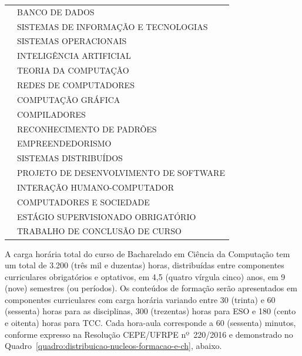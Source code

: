 \documentclass[
	12pt,				%
	openright,			%
  oneside,     %
	a4paper,			%
	chapter=TITLE,		%
	english,			%
	french,				%
	spanish,			%
	brazil				%
	]{abntex2}
\begin{document}
\begin{center}
\begin{scriptsize}
\begin{longtable}{@{}lp{10cm}}
                                & BANCO DE DADOS \\
                                & SISTEMAS DE INFORMAÇÃO E TECNOLOGIAS \\
                                & SISTEMAS OPERACIONAIS \\
                                & INTELIGÊNCIA ARTIFICIAL \\
                                & TEORIA DA COMPUTAÇÃO \\
                                & REDES DE COMPUTADORES \\
                                & COMPUTAÇÃO GRÁFICA \\
                                & COMPILADORES \\
                                & RECONHECIMENTO DE PADRÕES \\
                                & EMPREENDEDORISMO \\
                                & SISTEMAS DISTRIBUÍDOS \\
                                & PROJETO DE DESENVOLVIMENTO DE SOFTWARE \\
                                & INTERAÇÃO HUMANO-COMPUTADOR \\
                                & COMPUTADORES E SOCIEDADE \\
                                & ESTÁGIO SUPERVISIONADO OBRIGATÓRIO \\
                                & TRABALHO DE CONCLUSÃO DE CURSO\\
      \bottomrule
      \end{longtable}
    \end{scriptsize}      
  \end{center}

  A carga horária total do curso de Bacharelado em Ciência da Computação tem um total de 3.200 (três mil e duzentas) horas,  distribuídas entre componentes curriculares obrigatórios e optativos, em 4,5 (quatro vírgula cinco) anos, em 9 (nove) semestres (ou períodos). Os conteúdos de formação serão apresentados em componentes curriculares com carga horária variando entre 30 (trinta) e 60 (sessenta) horas para as disciplinas, 300 (trezentas) horas para ESO e 180 (cento e oitenta) horas para TCC. Cada hora-aula corresponde a 60 (sessenta) minutos, conforme expresso na Resolução CEPE/UFRPE nº~220/2016 e demonstrado no Quadro~\ref{quadro:distribuicao-nucleos-formacao-e-ch}, abaixo.
\end{document}
